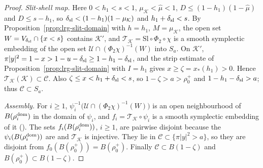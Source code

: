 \begin{proof}
\emph{Slit-shell map.} Here $0<h_1<s<1$, $\mu_{\mathcal K}<\hat\mu<1$, $D\le(1-h_1)(1-\hat\mu)$ and $D\le s-h_1$, so
$\delta_{\rm sl}<(1-h_1)(1-\mu_{\mathcal K})$ and $h_1+\delta_{\rm sl}<s$. By Proposition~\ref{prop:lrg-slit-domain} with
$h=h_1$, $M=\mu_{\mathcal K}$, the open set $W=V_{\delta_{\rm sl}}\cap\{x<s\}$ contains $\mathcal K'$, and
$\mathcal T_{\mathcal K}=\mathrm{Sl}\circ\Phi_2\circ\chi$ is a smooth symplectic embedding of the open set
$\mathcal U\cap(\Phi_2\chi)^{-1}(W)$ into $S_a$. On $\mathcal K'$, $\pi|y|^2=1-x>1-u-\delta_{\rm sl}\ge1-h_1-\delta_{\rm sl}$, and the
strip estimate of Proposition~\ref{prop:lrg-slit-domain} with $I=h_1$ gives $x\ge\zeta=x_*(h_1)>0$. Hence
$\mathcal T_{\mathcal K}(\mathcal K)\subset\mathcal C$. Also $\zeta\le x<h_1+\delta_{\rm sl}<s$, so $1-\zeta>a>\rho_0^+$ and
$1-h_1-\delta_{\rm sl}>a$; thus $\mathcal C\subset S_a$.

\emph{Assembly.} For $i\ge1$, $\psi_i^{-1}\bigl(\mathcal U\cap(\Phi_2\chi)^{-1}(W)\bigr)$ is an open neighbourhood of
$B(\rho_i^{\rm dom})$ in the domain of $\psi_i$, and $f_i=\mathcal T_{\mathcal K}\circ\psi_i$ is a smooth symplectic embedding of it
(). The sets $f_i(B(\rho_i^{\rm dom}))$, $i\ge1$, are pairwise disjoint because the
$\psi_i(B(\rho_i^{\rm dom}))$ are and $\mathcal T_{\mathcal K}$ is injective. They lie in $\mathcal C\subset\{\pi|y|^2>a\}$, so they are
disjoint from $f_0(B(\rho_0^+))=B(\rho_0^+)$. Finally $\mathcal C\subset B(1-\zeta)$ and $B(\rho_0^+)\subset B(1-\zeta)$.
\end{proof}
